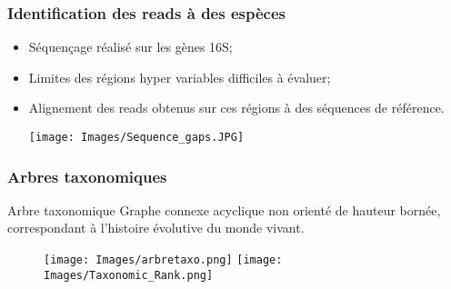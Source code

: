 \documentclass{beamer}
\begin{document}
\begin{frame}
\frametitle{Identification des reads à des espèces}

\begin{itemize}
\item Séquençage réalisé sur les gènes 16S;
\pause
\bigskip
\item Limites des \alert{régions hyper variables} difficiles à évaluer;
\pause
\bigskip
\item \alert{Alignement} des reads obtenus sur ces régions à des séquences de référence.
\pause

\begin{center}
\texttt{[image: Images/Sequence\_gaps.JPG]}
\end{center}

\end{itemize}

\end{frame}

\begin{frame}
\frametitle{Arbres taxonomiques}

\begin{block}{Arbre taxonomique} Graphe connexe acyclique non orienté de hauteur bornée, correspondant à l'histoire évolutive du monde vivant.
\end{block}


\begin{figure}
\subfigure\texttt{[image: Images/arbretaxo.png]}
\subfigure\texttt{[image: Images/Taxonomic\_Rank.png]}
\end{figure}


\end{frame}
\end{document}
